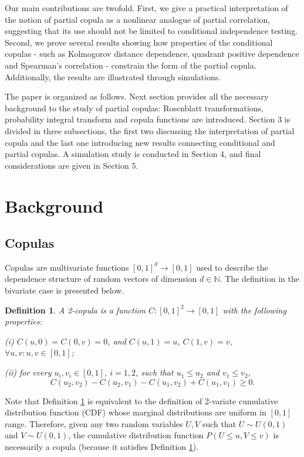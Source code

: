 \documentclass[
]{article}
\newtheorem{definition}{Definition}
\begin{document}
Our main contributions are twofold. First, we give a practical
interpretation of the notion of partial copula as a nonlinear analogue
of partial correlation, suggesting that its use should not be limited to
conditional independence testing. Second, we prove several results
showing how properties of the conditional copulas - such as Kolmogorov
distance dependence, quadrant positive dependence and Spearman's
correlation - constrain the form of the partial copula. Additionally,
the results are illustrated through simulations.

The paper is organized as follows. Next section provides all the
necessary background to the study of partial copulas: Rosenblatt
transformations, probability integral transform and copula functions are
introduced. Section 3 is divided in three subsections, the first two
discussing the interpretation of partial copula and the last one
introducing new results connecting conditional and partial copulas. A
simulation study is conducted in Section 4, and final considerations are
given in Section 5.

\section{Background}\label{background}

\subsection{Copulas}\label{copulas}

Copulas are multivariate functions \([0,1]^d \to [0,1]\) used to
describe the dependence structure of random vectors of dimension
\(d \in \mathbb{N}\). The definition in the bivariate case is presented
below.

\begin{definition}\label{def:2copula}
A 2-copula is a function $C: [0,1]^2 \to [0,1]$ with the following properties:

(i) $C(u,0) = C(0,v) = 0$, and $C(u,1) = u$, $C(1,v) = v$, $\forall u,v: u,v \in [0,1]$;

(ii) for every $u_i, v_i \in [0,1]$, $i = 1,2$, such that $u_1 \leq u_2$ and $v_1 \leq v_2$,
$$C(u_2, v_2) - C(u_2, v_1) - C(u_1, v_2) + C(u_1, v_1) \geq 0.$$
\end{definition}

Note that Definition \ref{def:2copula} is equivalent to the definition
of 2-variate cumulative distribution function (CDF) whose marginal
distributions are uniform in \([0,1]\) range. Therefore, given any two
random variables \(U, V\) such that \(U \sim U(0,1)\) and
\(V \sim U(0,1)\), the cumulative distribution function
\(P(U \leq u, V \leq v)\) is necessarily a copula (because it satisfies
Definition \ref{def:2copula}).
\end{document}
